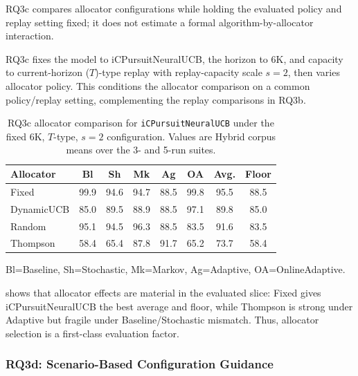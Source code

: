 RQ3c compares allocator configurations while holding the evaluated policy and replay setting fixed; it does not estimate a formal algorithm-by-allocator interaction.

RQ3c fixes the model to iCPursuitNeuralUCB, the horizon to 6K, and capacity to current-horizon ($T$)-type replay with replay-capacity scale $s=2$, then varies allocator policy. This conditions the allocator comparison on a common policy/replay setting, complementing the replay comparisons in RQ3b.

\begin{table}[ht!]
\footnotesize
\centering
\setlength{\tabcolsep}{3pt}
\caption{RQ3c allocator comparison for \texttt{iCPursuitNeuralUCB} under the fixed 6K, $T$-type, $s=2$ configuration. Values are Hybrid corpus means over the 3- and 5-run suites.}
\label{tab:rq3c_master_allocators}
\begin{tabular}{lccccccc}
\toprule
\textbf{Allocator} & \textbf{Bl} & \textbf{Sh} & \textbf{Mk} & \textbf{Ag} & \textbf{OA} & \textbf{Avg.} & \textbf{Floor} \\
\midrule
Fixed      & 99.9 & 94.6 & 94.7 & 88.5 & 99.8 & 95.5 & 88.5 \\
DynamicUCB & 85.0 & 89.5 & 88.9 & 88.5 & 97.1 & 89.8 & 85.0 \\
Random     & 95.1 & 94.5 & 96.3 & 88.5 & 83.5 & 91.6 & 83.5 \\
Thompson   & 58.4 & 65.4 & 87.8 & 91.7 & 65.2 & 73.7 & 58.4 \\
\bottomrule
\end{tabular}

{\footnotesize Bl=Baseline, Sh=Stochastic, Mk=Markov, Ag=Adaptive, OA=OnlineAdaptive.}
\end{table}

 shows that allocator effects are material in the evaluated slice: Fixed gives iCPursuitNeuralUCB the best average and floor, while Thompson is strong under Adaptive but fragile under Baseline/Stochastic mismatch. Thus, allocator selection is a first-class evaluation factor.

\subsubsection{RQ3d: Scenario-Based Configuration Guidance}
\label{subsec:rq3d_answer}

